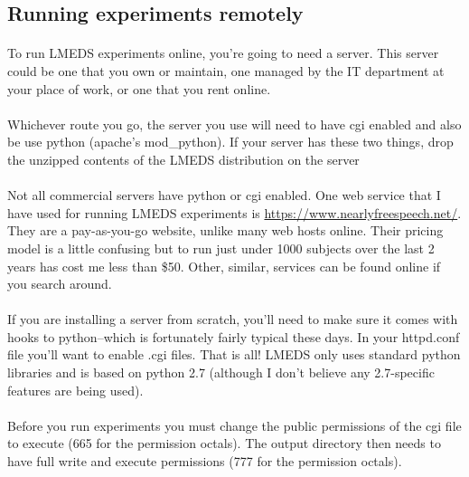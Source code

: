 \documentclass[12pt, oneside]{scrbook}   	%
\begin{document}
\subsection{Running experiments remotely}

\paragraph{}
To run LMEDS experiments online, you're going to need a server.  This server could be one that you own or maintain, one managed by the IT department at your place of work, or one that you rent online.

\paragraph{}
Whichever route you go, the server you use will need to have cgi enabled and also be use python (apache's mod\_python).  If your server has these two things, drop the unzipped contents of the LMEDS distribution on the server

\paragraph{}
Not all commercial servers have python or cgi enabled.  One web service that I have used for running LMEDS experiments is \url{https://www.nearlyfreespeech.net/}.  They are a pay-as-you-go website, unlike many web hosts online.  Their pricing model is a little confusing but to run just under 1000 subjects over the last 2 years has cost me less than \$50.  Other, similar, services can be found online if you search around.

\paragraph{}
If you are installing a server from scratch, you'll need to make sure it comes with hooks to python--which is fortunately fairly typical these days.  In your httpd.conf file you'll want to enable .cgi files.  That is all!  LMEDS only uses standard python libraries and is based on python 2.7 (although I don't believe any 2.7-specific features are being used).

\paragraph{}
\begin{tcolorbox}[breakable,colback=white,colframe=green,width=\dimexpr\textwidth+12mm\relax,enlarge left by=-6mm,enlarge right by=6mm]
Before you run experiments you must change the public permissions of the cgi file to execute (665 for the permission octals).  The output directory then needs to have full write and execute permissions (777 for the permission octals).
\end{tcolorbox}
\end{document}
